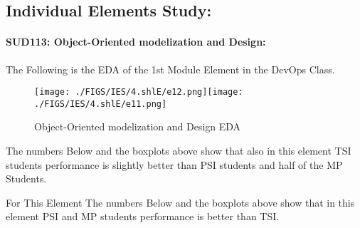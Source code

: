 \documentclass[12pt]{extreport}
\begin{document}
\subsection{Individual Elements Study:}




\paragraph{\large SUD113: Object-Oriented modelization and Design:\\
} 
The Following is the EDA of the 1st Module Element in the DevOps Class.
\begin{figure}[H]
	\centering
	\texttt{[image: ./FIGS/IES/4.shlE/e12.png]}\texttt{[image: ./FIGS/IES/4.shlE/e11.png]}
	\caption{Object-Oriented modelization and Design EDA}
	\label{fig:44}
\end{figure}

The numbers Below and the boxplots above show that also in this element  TSI students performance is slightly better than PSI students and half of the MP Students.

For This Element The numbers Below and the boxplots above show that in this element  PSI and MP students performance is  better than TSI.
\end{document}
